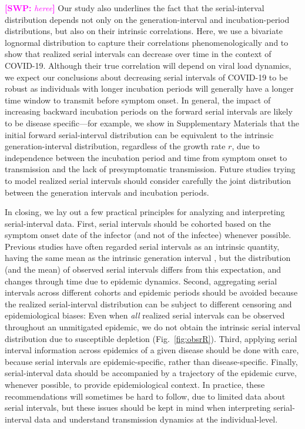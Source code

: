 \documentclass[12pt]{article}
\newcommand{\comment}{\showcomment}
\newcommand{\showcomment}[3]{\textcolor{#1}{\textbf{[#2: }\textsl{#3}\textbf{]}}}
\newcommand{\swp}[1]{\comment{magenta}{SWP}{#1}}
\newcommand{\fref}[1]{Fig.~\ref{fig:#1}}
\begin{document}
\swp{heree}
Our study also underlines the fact that the serial-interval distribution depends not only on the generation-interval and incubation-period distributions, but also on their intrinsic correlations.
Here, we use a bivariate lognormal distribution to capture their correlations phenomenologically and to show that realized serial intervals can decrease over time in the context of COVID-19.
Although their true correlation will depend on viral load dynamics, we expect our conclusions about decreasing serial intervals of COVID-19 to be robust as individuals with longer incubation periods will generally have a longer time window to transmit before symptom onset.
In general, the impact of increasing backward incubation periods on the forward serial intervals are likely to be disease specific---for example, we show in Supplementary Materials that the initial forward serial-interval distribution can be equivalent to the intrinsic generation-interval distribution, regardless of the growth rate $r$, due to independence between the incubation period and time from symptom onset to transmission and the lack of presymptomatic transmission.
Future studies trying to model realized serial intervals should consider carefully the joint distribution between the generation intervals and incubation periods.

In closing, we lay out a few practical principles for analyzing and interpreting serial-interval data.
First, serial intervals should be cohorted based on the symptom onset date of the infector (and not of the infectee) whenever possible.
Previous studies have often regarded serial intervals as an intrinsic quantity, having the same mean as the intrinsic generation interval \citep{svensson2007note,klinkenberg2011correlation,champredon2018equivalence, britton2019estimation}, but the distribution (and the mean) of observed serial intervals differs from this expectation, and changes through time due to epidemic dynamics.
Second, aggregating serial intervals across different cohorts and epidemic periods should be avoided because the realized serial-interval distribution can be subject to different censoring and epidemiological biases:
Even when \emph{all} realized serial intervals can be observed throughout an unmitigated epidemic, we do not obtain the intrinsic serial interval distribution due to susceptible depletion (\fref{obsrR}).
Third, applying serial interval information across epidemics of a given disease should be done with care, because serial intervals are epidemic-specific, rather than disease-specific.
Finally, serial-interval data should be accompanied by a trajectory of the epidemic curve, whenever possible, to provide epidemiological context.
In practice, these recommendations will sometimes be hard to follow, due to limited data about serial intervals, but these issues should be kept in mind when interpreting serial-interval data and understand transmission dynamics at the individual-level.
\end{document}
